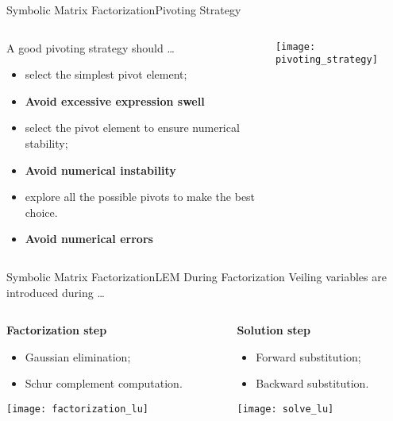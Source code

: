 \begin{frame}{Symbolic Matrix Factorization}{Pivoting Strategy}
  \begin{columns}
    \begin{column}[c]{0.5\textwidth}
      A good pivoting strategy should \dots
      \begin{itemize}
        \item select the simplest pivot element;
        \item[] \textbf{\small Avoid excessive expression swell}
        \item select the pivot element to ensure numerical stability;
        \item[] \textbf{\small Avoid numerical instability}
        \item explore all the possible pivots to make the best choice.
        \item[] \textbf{\small Avoid numerical errors}
      \end{itemize}
    \end{column}
    \begin{column}[c]{0.5\textwidth}
      \texttt{[image: pivoting\_strategy]}
    \end{column}
  \end{columns}
\end{frame}

\begin{frame}{Symbolic Matrix Factorization}{\ac{LEM} During Factorization}
  Veiling variables are introduced during \dots \\[1.0em]
  \begin{columns}
    \begin{column}[t]{0.5\textwidth}
      \textbf{Factorization step} \\
      \begin{itemize}\small
        \item Gaussian elimination;
        \item Schur complement computation.
      \end{itemize}
      {\centering \texttt{[image: factorization\_lu]}}
    \end{column}
    \begin{column}[t]{0.5\textwidth}
      \textbf{Solution step} \\
      \begin{itemize}\small
        \item Forward substitution;
        \item Backward substitution.
      \end{itemize}
      {\centering \texttt{[image: solve\_lu]}}
    \end{column}
  \end{columns}
\end{frame}


